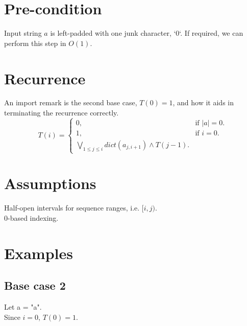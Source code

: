 \documentclass{article}
\begin{document}
	\section{Pre-condition}
		Input string $a$ is left-padded with one junk character, `0`.
		If required, we can perform this step in $O(1)$.
	
	\section{Recurrence}
		An import remark is the second base case, $T(0)=1$, and how it aids in terminating the recurrence correctly.
		\begin{equation}
			T(i)=\begin{cases}
				0, & \text{if $|a|=0$}.\\
				1, & \text{if $i=0$}.\\
				\underset{1 \leq j \leq i}{\bigvee} dict(a_{j,i+1}) \wedge T(j-1).
			\end{cases}
		\end{equation}
	\section{Assumptions}
	Half-open intervals for sequence ranges, i.e. $[i,j)$.\\
	0-based indexing.
	
	\section{Examples}	
		\subsection{Base case 2}
			Let a = "a".\\
			Since $i=0$, $T(0) = 1$.
			
\end{document}
